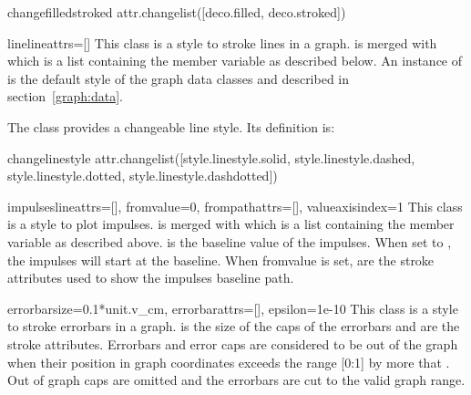 \begin{memberdesc}{changefilledstroked}
  attr.changelist([deco.filled, deco.stroked])
\end{memberdesc} %

\begin{classdesc}{line}{lineattrs=[]} %
  This class is a style to stroke lines in a graph.
   is merged with  which is
  a list containing the member variable  as
  described below. An instance of  is the default style
  of the graph data classes  and 
  described in section~\ref{graph:data}.
\end{classdesc}

The class  provides a changeable line style. Its
definition is:

\begin{memberdesc}{changelinestyle}
  attr.changelist([style.linestyle.solid, style.linestyle.dashed, style.linestyle.dotted, style.linestyle.dashdotted])
\end{memberdesc} %

\begin{classdesc}{impulses}{lineattrs=[], fromvalue=0, %
                             frompathattrs=[], valueaxisindex=1}
  This class is a style to plot impulses.  is merged
  with  which is a list containing the member
  variable  as described above. 
  is the baseline value of the impulses. When set to , the
  impulses will start at the baseline. When fromvalue is set,
   are the stroke attributes used to show the
  impulses baseline path.
\end{classdesc} %

\begin{classdesc}{errorbar}{size=0.1*unit.v\_cm, errorbarattrs=[], %
                            epsilon=1e-10}
  This class is a style to stroke errorbars in a graph.  is
  the size of the caps of the errorbars and  are
  the stroke attributes. Errorbars and error caps are considered to be
  out of the graph when their position in graph coordinates exceeds
  the range [0:1] by more that . Out of graph caps are
  omitted and the errorbars are cut to the valid graph range.
\end{classdesc} %


